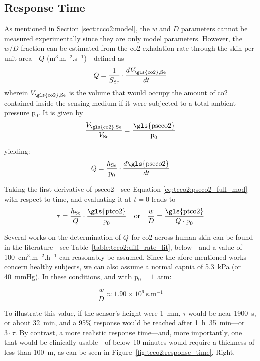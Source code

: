 \subsection{Response Time}\label{sect:tcco2:response_time}

As mentioned in Section \ref{sect:tcco2:model}, the $w$ and $D$ parameters cannot be measured experimentally since they are only model parameters. However, the $w/D$ fraction can be estimated from the \gls{co2} exhalation rate through the skin per unit area---$Q$ (m$^{3}$.m$^{-2}$.s$^{-1}$)---defined as
\begin{equation}
	Q = \frac{1}{S_\text{Se}} \cdot \frac{d V_\text{\gls{co2},Se}}{dt}
\end{equation}
wherein $V_\text{\gls{co2},Se}$ is the volume that would occupy the amount of \gls{co2} contained inside the sensing medium if it were subjected to a total ambient pressure p$_0$. It is given by
\begin{equation}
	\frac{V_\text{\gls{co2},Se} }{V_\text{Se}} = \frac{\text{\gls{pseco2}}}{\text{p}_0}
\end{equation}

yielding:
\begin{equation}
	Q = \frac{h_\text{Se}}{\text{p}_0} \cdot \frac{d \text{\gls{pseco2}}}{dt}
\end{equation}

Taking the first derivative of \gls{pseco2}---see Equation \ref{eq:tcco2:pseco2_full_mod}---with respect to time, and evaluating it at $t=0$ leads to
\begin{equation}
	\tau = \frac{h_\text{Se}}{Q} \cdot \frac{\text{\gls{ptco2}}}{\text{p}_0} \quad \text{or} \quad \frac{w}{D} = \frac{\text{\gls{ptco2}}}{Q \cdot \text{p}_0}
\end{equation}

Several works on the determination of $Q$ for \gls{co2} across human skin can be found in the literature---see Table~\ref{table:tcco2:diff_rate_lit}, below---and a value of 100~cm$^3$.m$^{-2}$.h$^{-1}$ can reasonably be assumed. Since the afore-mentioned works concern healthy subjects, we can also assume a normal capnia of 5.3~kPa (or 40~mmHg)\cite{geers2000}. In these conditions, and with p$_0 = 1$~atm:

\begin{equation}
	\frac{w}{D} \approx 1.90\times10^6~\text{s.m$^{-1}$}
\end{equation}

To illustrate this value, if the sensor's height were 1~mm, $\tau$ would be near 1900~s, or about 32~min, and a 95\% response would be reached after 1~h~35~min---or $3\cdot \tau$. By contrast, a more realistic response time---and, more importantly, one that would be clinically usable---of below 10 minutes would require a thickness of less than 100~{\textmu}m, as can be seen in Figure~\ref{fig:tcco2:response_time}, Right.

